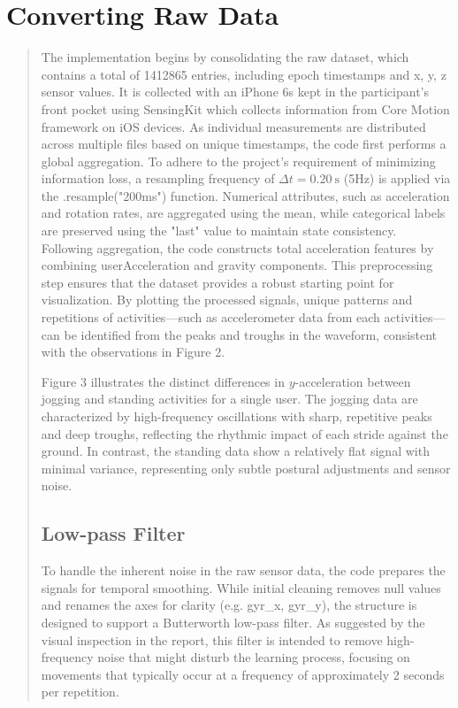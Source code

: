 \documentclass[11pt,a4paper]{article}
\begin{document}
\section{Converting Raw Data}
\begin{quote}
The implementation begins by consolidating the raw dataset, which contains a total of 1412865 entries, including epoch timestamps and x, y, z sensor values. It is collected with an iPhone 6s kept in the participant's front pocket using SensingKit which collects information from Core Motion framework on iOS devices. As individual measurements are distributed across multiple files based on unique timestamps, the code first performs a global aggregation. To adhere to the project's requirement of minimizing information loss, a resampling frequency of $\Delta t = 0.20\ \mathrm{s}$ (5Hz) is applied via the .resample("200ms") function. Numerical attributes, such as acceleration and rotation rates, are aggregated using the mean, while categorical labels are preserved using the "last" value to maintain state consistency.
Following aggregation, the code constructs total acceleration features by combining userAcceleration and gravity components. This preprocessing step ensures that the dataset provides a robust starting point for visualization. By plotting the processed signals, unique patterns and repetitions of activities—such as accelerometer data from each activities—can be identified from the peaks and troughs in the waveform, consistent with the observations in Figure 2.

Figure 3 illustrates the distinct differences in $y$-acceleration between jogging and standing activities for a single user. The jogging data are characterized by high-frequency oscillations with sharp, repetitive peaks and deep troughs, reflecting the rhythmic impact of each stride against the ground. In contrast, the standing data show a relatively flat signal with minimal variance, representing only subtle postural adjustments and sensor noise.

\subsection{Low-pass Filter}
To handle the inherent noise in the raw sensor data, the code prepares the signals for temporal smoothing. While initial cleaning removes null values and renames the axes for clarity (e.g. gyr\_x, gyr\_y), the structure is designed to support a Butterworth low-pass filter. As suggested by the visual inspection in the report, this filter is intended to remove high-frequency noise that might disturb the learning process, focusing on movements that typically occur at a frequency of approximately 2 seconds per repetition.


\end{quote}
\end{document}

